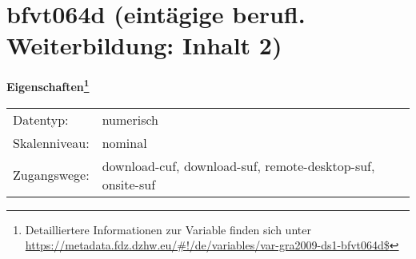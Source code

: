 
    \setcounter{footnote}{0}

    \vspace*{-1.8cm}
	\section{bfvt064d (eintägige berufl. Weiterbildung: Inhalt 2)}
	\label{section:bfvt064d}



    \vspace*{0.5cm}
    \noindent\textbf{Eigenschaften\footnote{Detailliertere Informationen zur Variable finden sich unter
		\url{https://metadata.fdz.dzhw.eu/\#!/de/variables/var-gra2009-ds1-bfvt064d$}}}\\
	\begin{tabularx}{\hsize}{@{}lX}
	Datentyp: & numerisch \\
	Skalenniveau: & nominal \\
	Zugangswege: &
	  download-cuf, 
	  download-suf, 
	  remote-desktop-suf, 
	  onsite-suf
 \\
    \end{tabularx}



